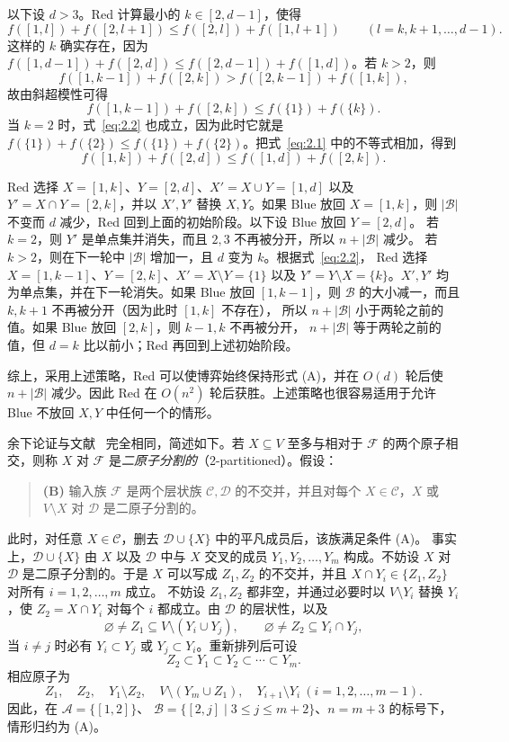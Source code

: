 \documentclass[UTF8,11pt,a4paper]{ctexart}
\numberwithin{equation}{section}
\newcommand{\calF}{\mathcal F}
\newcommand{\calA}{\mathcal A}
\newcommand{\calB}{\mathcal B}
\newcommand{\calC}{\mathcal C}
\newcommand{\calD}{\mathcal D}
\begin{document}
以下设 $d>3$。Red 计算最小的 $k\in[2,d-1]$，使得
\begin{equation}\label{eq:2.1}
f([1,l])+f([2,l+1])\le f([2,l])+f([1,l+1])
\qquad(l=k,k+1,\ldots,d-1).
\end{equation}
这样的 $k$ 确实存在，因为
$f([1,d-1])+f([2,d])\le f([2,d-1])+f([1,d])$。若 $k>2$，则
\[
f([1,k-1])+f([2,k])>f([2,k-1])+f([1,k]),
\]
故由斜超模性可得
\begin{equation}\label{eq:2.2}
f([1,k-1])+f([2,k])\le f(\{1\})+f(\{k\}).
\end{equation}
当 $k=2$ 时，式~\eqref{eq:2.2} 也成立，因为此时它就是
$f(\{1\})+f(\{2\})\le f(\{1\})+f(\{2\})$。把式~\eqref{eq:2.1} 中的不等式相加，得到
\[
f([1,k])+f([2,d])\le f([1,d])+f([2,k]).
\]

Red 选择 $X=[1,k]$、$Y=[2,d]$、$X'=X\cup Y=[1,d]$ 以及
$Y'=X\cap Y=[2,k]$，并以 $X',Y'$ 替换 $X,Y$。如果 Blue 放回 $X=[1,k]$，则
$|\calB|$ 不变而 $d$ 减少，Red 回到上面的初始阶段。以下设 Blue 放回 $Y=[2,d]$。
若 $k=2$，则 $Y'$ 是单点集并消失，而且 $2,3$ 不再被分开，所以 $n+|\calB|$ 减少。
若 $k>2$，则在下一轮中 $|\calB|$ 增加一，且 $d$ 变为 $k$。根据式~\eqref{eq:2.2}，
Red 选择 $X=[1,k-1]$、$Y=[2,k]$、$X'=X\setminus Y=\{1\}$ 以及
$Y'=Y\setminus X=\{k\}$。$X',Y'$ 均为单点集，并在下一轮消失。如果 Blue 放回
$[1,k-1]$，则 $\calB$ 的大小减一，而且 $k,k+1$ 不再被分开（因为此时 $[1,k]$ 不存在），
所以 $n+|\calB|$ 小于两轮之前的值。如果 Blue 放回 $[2,k]$，则 $k-1,k$ 不再被分开，
$n+|\calB|$ 等于两轮之前的值，但 $d=k$ 比以前小；Red 再回到上述初始阶段。

综上，采用上述策略，Red 可以使博弈始终保持形式 (A)，并在 $O(d)$ 轮后使
$n+|\calB|$ 减少。因此 Red 在 $O(n^2)$ 轮后获胜。上述策略也很容易适用于允许 Blue 不放回
$X,Y$ 中任何一个的情形。

余下论证与文献~\cite{Karzanov} 完全相同，简述如下。若 $X\subseteq V$ 至多与相对于
$\calF$ 的两个原子相交，则称 $X$ 对 $\calF$ 是\emph{二原子分割的}（2-partitioned）。假设：

\begin{quote}
\textbf{(B)} 输入族 $\calF$ 是两个层状族 $\calC,\calD$ 的不交并，并且对每个
$X\in\calC$，$X$ 或 $V\setminus X$ 对 $\calD$ 是二原子分割的。
\end{quote}

此时，对任意 $X\in\calC$，删去 $\calD\cup\{X\}$ 中的平凡成员后，该族满足条件 (A)。
事实上，$\calD\cup\{X\}$ 由 $X$ 以及 $\calD$ 中与 $X$ 交叉的成员
$Y_1,Y_2,\ldots,Y_m$ 构成。不妨设 $X$ 对 $\calD$ 是二原子分割的。于是 $X$ 可以写成
$Z_1,Z_2$ 的不交并，并且 $X\cap Y_i\in\{Z_1,Z_2\}$ 对所有 $i=1,2,\ldots,m$ 成立。
不妨设 $Z_1,Z_2$ 都非空，并通过必要时以 $V\setminus Y_i$ 替换 $Y_i$，使
$Z_2=X\cap Y_i$ 对每个 $i$ 都成立。由 $\calD$ 的层状性，以及
\[
\varnothing\ne Z_1\subseteq V\setminus(Y_i\cup Y_j),
\qquad
\varnothing\ne Z_2\subseteq Y_i\cap Y_j,
\]
当 $i\ne j$ 时必有 $Y_i\subset Y_j$ 或 $Y_j\subset Y_i$。重新排列后可设
\[
Z_2\subset Y_1\subset Y_2\subset\cdots\subset Y_m.
\]
相应原子为
\[
Z_1,\quad Z_2,\quad Y_1\setminus Z_2,\quad V\setminus(Y_m\cup Z_1),
\quad Y_{i+1}\setminus Y_i\ (i=1,2,\ldots,m-1).
\]
因此，在 $\calA=\{[1,2]\}$、
$\calB=\{[2,j]\mid3\le j\le m+2\}$、$n=m+3$ 的标号下，情形归约为 (A)。
\end{document}

